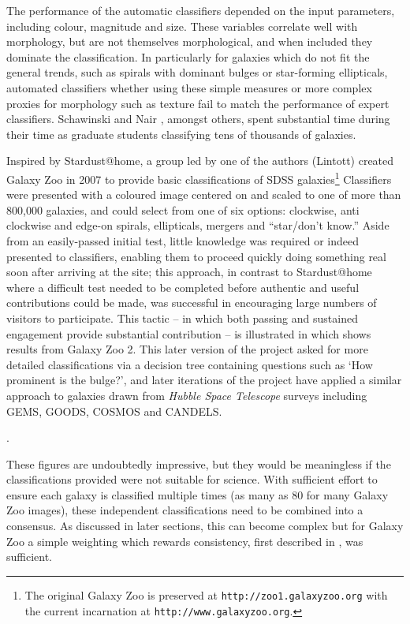 \documentclass{ar2e}
\begin{document}

The performance of the automatic classifiers depended on the input parameters,
including colour, magnitude and size. These variables correlate well with
morphology, but are not themselves morphological, and when included they
dominate the classification. In particularly for galaxies which do not fit the
general trends, such as spirals with dominant bulges or star-forming
ellipticals, automated classifiers whether using these simple measures or more
complex proxies for morphology such as texture fail to match the performance
of expert classifiers. Schawinski \citep{Scha2007} and Nair \citep{Nair}, amongst others, spent substantial
time during their time as graduate students classifying tens of thousands of
galaxies. 

Inspired by Stardust@home, a group led by one of the authors (Lintott) created
Galaxy Zoo in 2007 to provide basic classifications of SDSS
galaxies\footnote{The original Galaxy Zoo is preserved at
\texttt{http://zoo1.galaxyzoo.org} with the current incarnation at
\texttt{http://www.galaxyzoo.org}.} Classifiers were presented with a coloured
image centered on and scaled to one of more than 800,000 galaxies, and could
select from one of six options: clockwise, anti clockwise and edge-on spirals,
ellipticals, mergers and ``star/don't know.'' Aside from  an easily-passed
initial test, little knowledge was required or indeed presented to classifiers,
enabling them to proceed quickly doing something real soon after arriving at the
site; this approach, in contrast to Stardust@home where a difficult test needed
to be completed before authentic and useful contributions could be made, was
successful in encouraging large numbers of visitors to participate. This tactic
-- in which both passing and sustained engagement provide substantial
contribution -- is illustrated in \Fref{}  which shows results from Galaxy Zoo
2.  This later version of the project asked for more detailed
classifications via a decision tree containing questions such as `How prominent
is the bulge?', and later iterations of the project have applied a similar
approach to galaxies drawn from \emph{Hubble Space Telescope} surveys including
\textsc{GEMS, GOODS, COSMOS} and \textsc{CANDELS}. 

. 

These figures are undoubtedly impressive, but they would be meaningless if the
classifications provided were not suitable for science. With sufficient effort
to ensure each galaxy is classified multiple times (as many as 80 for many
Galaxy Zoo images), these independent classifications need to be combined into a
consensus. As discussed in later sections, this can become complex but for
Galaxy Zoo a simple weighting which rewards consistency, first described in
\citet{Land++}, was sufficient. 
\end{document}
